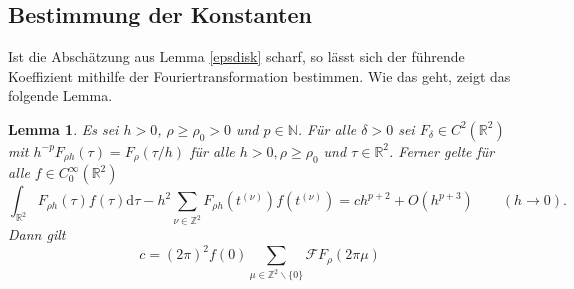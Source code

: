 \documentclass[12pt,a4paper]{scrartcl}
\newtheorem{Lemma}[Satz]{Lemma}
\newcommand{\dd}{\mathrm{d}}
\numberwithin{equation}{section}
\newcommand{\R}{\mathbb{R}} %
\newcommand{\Z}{\mathbb{Z}} %
\newcommand{\N}{\mathbb{N}} %
\newcommand{\F}{\mathcal{F}} %
\begin{document}
\subsection{Bestimmung der Konstanten} \label{chaFourierKonstanen}
Ist die Abschätzung aus Lemma \ref{epsdisk} scharf, so lässt sich der führende Koeffizient mithilfe der Fouriertransformation bestimmen. Wie das geht, zeigt das folgende Lemma.
\begin{Lemma} \label{LFourierconst}
Es sei $h>0$, $\rho \geq \rho_0 >0$ und $p \in \N$. Für alle $\delta >0$ sei $F_\delta \in C^2(\R^2)$ mit $h^{-p} F_{\rho h}(\tau) = F_\rho(\tau/h)$ für alle $h>0,\rho \geq \rho_0$ und $\tau \in \R^2$. Ferner gelte für alle $f \in C_0^\infty(\R^2)$
\[
\int_{\R^2} F_{\rho h}(\tau)f(\tau) \dd \tau - h^2 \sum_{\nu \in \Z^2} F_{\rho h } (t^{(\nu)})f(t^{(\nu)}) =c h^{p+2} + O(h^{p+3}) \qquad (h \to 0).
\]
Dann gilt 
\[
c=(2 \pi)^2 f(0) \sum_{\mu \in \Z^2 \backslash \{0\} } \F F_\rho(2 \pi \mu)
\]
\end{Lemma}
\end{document}
